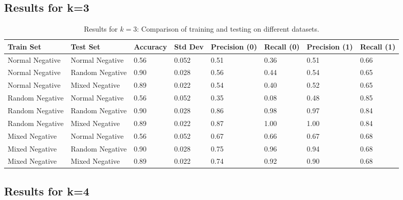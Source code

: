 \documentclass[11pt, a4paper, hidelinks]{article}
\begin{document}
\subsection{Results for k=3}\label{subsec:results-for-k=3}

\begin{table}[H]
    \centering
    \begin{tabular}{|l|l|l|l|l|l|l|l|}
        \hline
        \textbf{Train Set} & \textbf{Test Set} & \textbf{Accuracy} & \textbf{Std Dev} & \textbf{Precision (0)} & \textbf{Recall (0)} & \textbf{Precision (1)} & \textbf{Recall (1)} \\
        \hline
        Normal Negative & Normal Negative & 0.56 & 0.052 & 0.51 & 0.36 & 0.51 & 0.66 \\
        \hline
        Normal Negative & Random Negative & 0.90 & 0.028 & 0.56 & 0.44 & 0.54 & 0.65 \\
        \hline
        Normal Negative & Mixed Negative & 0.89 & 0.022 & 0.54 & 0.40 & 0.52 & 0.65 \\
        \hline
        Random Negative & Normal Negative & 0.56 & 0.052 & 0.35 & 0.08 & 0.48 & 0.85 \\
        \hline
        Random Negative & Random Negative & 0.90 & 0.028 & 0.86 & 0.98 & 0.97 & 0.84 \\
        \hline
        Random Negative & Mixed Negative & 0.89 & 0.022 & 0.87 & 1.00 & 1.00 & 0.84 \\
        \hline
        Mixed Negative & Normal Negative & 0.56 & 0.052 & 0.67 & 0.66 & 0.67 & 0.68 \\
        \hline
        Mixed Negative & Random Negative & 0.90 & 0.028 & 0.75 & 0.96 & 0.94 & 0.68 \\
        \hline
        Mixed Negative & Mixed Negative & 0.89 & 0.022 & 0.74 & 0.92 & 0.90 & 0.68 \\
        \hline
    \end{tabular}
    \caption{Results for \(k = 3\): Comparison of training and testing on different datasets.}
    \label{tab:results_k3}
\end{table}

\subsection{Results for k=4}\label{subsec:results-for-k=4}
\end{document}
